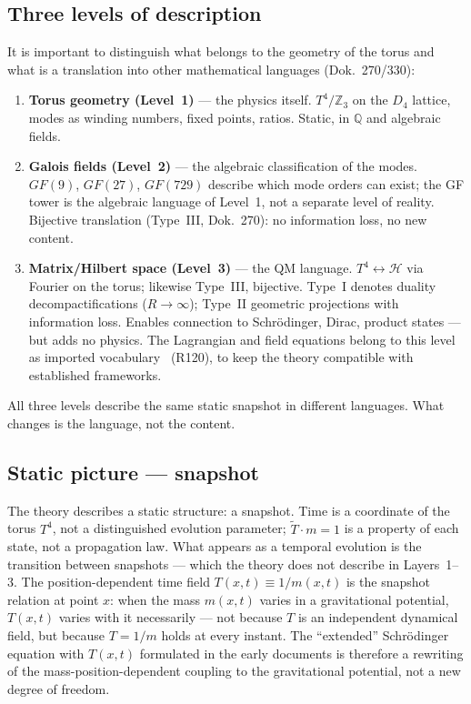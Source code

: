 \subsection*{Three levels of description}

It is important to distinguish what belongs to the geometry of the torus and
what is a translation into other mathematical languages (Dok.~270/330):

\begin{enumerate}[nosep]
\item \textbf{Torus geometry (Level~1)} --- the physics itself. $T^4/\mathbb{Z}_3$
on the $D_4$ lattice, modes as winding numbers, fixed points, ratios. Static,
in $\mathbb{Q}$ and algebraic fields.
\item \textbf{Galois fields (Level~2)} --- the algebraic classification of the
modes. $GF(9)$, $GF(27)$, $GF(729)$ describe which mode orders can exist; the
GF tower is the algebraic language of Level~1, not a separate level of reality.
Bijective translation (Type~III, Dok.~270): no information loss, no new content.
\item \textbf{Matrix/Hilbert space (Level~3)} --- the QM language.
$T^4\leftrightarrow\mathcal{H}$ via Fourier on the torus; likewise Type~III,
bijective. Type~I denotes duality decompactifications ($R\to\infty$);
Type~II geometric projections with information loss. Enables connection to Schrödinger, Dirac, product states --- but adds
no physics. The Lagrangian and field equations belong to this level as imported
vocabulary \EM\ (R120), to keep the theory compatible with established frameworks.
\end{enumerate}

All three levels describe the same static snapshot in different languages.
What changes is the language, not the content.

\subsection*{Static picture --- snapshot}

The theory describes a static structure: a snapshot. Time is a coordinate of
the torus $T^4$, not a distinguished evolution parameter; $\tilde{T}\cdot m=1$
is a property of each state, not a propagation law. What appears as a temporal
evolution is the transition between snapshots --- which the theory does not
describe in Layers~1--3. The position-dependent time field
$T(x,t)\equiv1/m(x,t)$ is the snapshot relation at point $x$: when the mass
$m(x,t)$ varies in a gravitational potential, $T(x,t)$ varies with it
necessarily --- not because $T$ is an independent dynamical field, but because
$T=1/m$ holds at every instant. The ``extended'' Schrödinger equation with
$T(x,t)$ formulated in the early documents is therefore a rewriting of the
mass-position-dependent coupling to the gravitational potential, not a new
degree of freedom.

